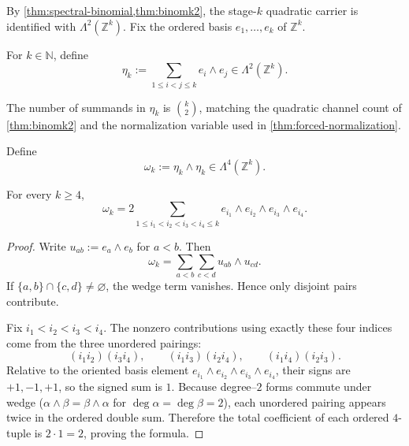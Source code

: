 By \cref{thm:spectral-binomial,thm:binomk2}, the stage-\(k\) quadratic
carrier is identified with
\(\Lambda^2(\mathbb Z^k)\).
Fix the ordered basis \(e_1,\dots,e_k\) of \(\mathbb Z^k\).

\begin{definition}
\label{def:numbers-depth-profile}
For \(k\in\mathbb N\), define
\[
  \eta_k
  :=
  \sum_{1\le i<j\le k} e_i\wedge e_j
  \in \Lambda^2(\mathbb Z^k).
\]
\end{definition}

\begin{remark}
\label{rem:numbers-q2-compatibility}
The number of summands in \(\eta_k\) is \(\binom{k}{2}\),
matching the quadratic channel count of \cref{thm:binomk2} and the
normalization variable used in \cref{thm:forced-normalization}.
\end{remark}

\begin{definition}
\label{def:numbers-quartic-profile}
Define
\[
  \omega_k := \eta_k\wedge\eta_k
  \in \Lambda^4(\mathbb Z^k).
\]
\end{definition}

\begin{lemma}
\label{lem:numbers-quartic-expansion}
For every \(k\ge 4\),
\[
  \omega_k
  =
  2\sum_{1\le i_1<i_2<i_3<i_4\le k}
  e_{i_1}\wedge e_{i_2}\wedge e_{i_3}\wedge e_{i_4}.
\]
\end{lemma}

\begin{proof}
Write \(u_{ab}:=e_a\wedge e_b\) for \(a<b\).
Then
\[
  \omega_k
  =
  \sum_{a<b}\sum_{c<d} u_{ab}\wedge u_{cd}.
\]
If \(\{a,b\}\cap\{c,d\}\neq\varnothing\), the wedge term vanishes.
Hence only disjoint pairs contribute.

Fix \(i_1<i_2<i_3<i_4\).
The nonzero contributions using exactly these four indices come from the
three unordered pairings:
\[
  (i_1i_2)(i_3i_4),\qquad
  (i_1i_3)(i_2i_4),\qquad
  (i_1i_4)(i_2i_3).
\]
Relative to the oriented basis element
\(e_{i_1}\wedge e_{i_2}\wedge e_{i_3}\wedge e_{i_4}\), their signs are
\(+1,-1,+1\), so the signed sum is \(1\).
Because degree--\(2\) forms commute under wedge
(\(\alpha\wedge\beta=\beta\wedge\alpha\) for \(\deg\alpha=\deg\beta=2\)),
each unordered pairing appears twice in the ordered double sum.
Therefore the total coefficient of each ordered \(4\)-tuple is
\(2\cdot 1=2\), proving the formula.
\end{proof}

